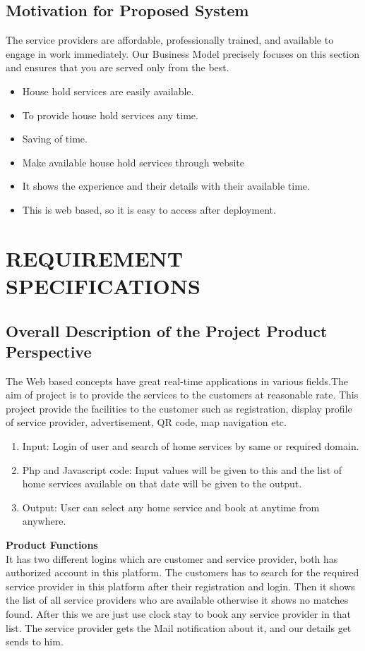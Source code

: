 \documentclass[12pt,a4paper]{report}
\begin{document}
\begin{titlepage}
{\section{ Motivation for Proposed System }
\vspace{0.5cm}
The service providers are affordable, professionally trained, and available to engage in work immediately. Our Business Model precisely focuses on this section and ensures that you are served only from the best.\\
\begin{itemize}
	\item House hold services are easily available.
	\item To provide house hold services any time.
	\item Saving of time.
	\item Make available house hold services through website
	\item It shows the experience and their details with their available time.
	\item  This is web based, so it is easy to access after deployment.
\end{itemize}
\newpage
\chapter{ REQUIREMENT SPECIFICATIONS }

\section{ Overall Description of the Project Product Perspective}
\vspace{0.5cm}
The Web based concepts have great real-time applications in various
fields.The aim of project is to provide the services to the customers at reasonable rate. This project provide the facilities to the customer such as registration, display profile of service provider, advertisement, QR code, map navigation etc.
\begin{enumerate}
	\item Input: Login of user and search of home services by same or required domain.
	\item Php and Javascript code: Input values will be given to this and the list of home services available on that date will be given to the output.
	\item Output: User can select any home service and book at anytime from anywhere.
	\vspace{0.5cm}
\end{enumerate}
\raggedright
\textbf{Product Functions}\\
\vspace{0.5cm}
It has two different logins which are customer and service provider, both has authorized account in this platform. The customers has to search for the required service provider in this platform after their registration and login. Then it shows the list of all service providers who are available otherwise it shows no matches found. After this we are just use clock stay to book any service provider in that list. The service provider gets the Mail notification about it, and our details get sends to him.
}
\end{titlepage}
\end{document}
